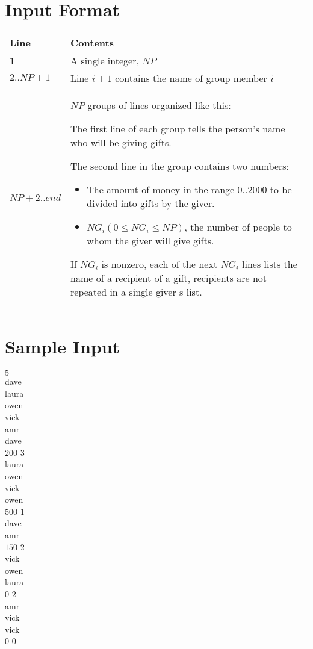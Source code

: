\documentclass{article}
\begin{document}
\section*{Input Format}
\begin{tabular}{ | m{2in} | m{2in} | }
\hline
\cellcolor{blue!25}\textbf{Line}&\cellcolor{red!25}\textbf{Contents}\\
\hline
\cellcolor{green!25}\textbf{1}&A single integer, $NP$\\
\hline
\cellcolor{purple!25}$2..NP+1$&Line $i+1$ contains the name of group member $i$\\
\hline
\cellcolor{orange!25}$NP+2..end$&
$NP$ groups of lines organized like this:

The first line of each group tells the person's name who will be giving gifts.

The second line in the group contains two numbers:
\begin{itemize}
\item The amount of money in the range $0..2000$ to be divided into gifts by the giver.
\item $NG_i (0 \leq NG_i \leq NP)$, the number of people to whom the giver will give gifts.
\end{itemize}
If $NG_i$ is nonzero, each of the next $NG_i$ lines lists the name of a recipient of a gift, recipients are not repeated in a single giver
s list.\\
\hline
\end{tabular}
\section*{Sample Input}
$5$\\
dave\\
laura\\
owen\\
vick\\
amr\\
dave\\
$200$ $3$\\
laura\\
owen\\
vick\\
owen\\
$500$ $1$\\
dave\\
amr\\
$150$ $2$\\
vick\\
owen\\
laura\\
$0$ $2$\\
amr\\
vick\\
vick\\
$0$ $0$\\
\newpage
\end{document}
